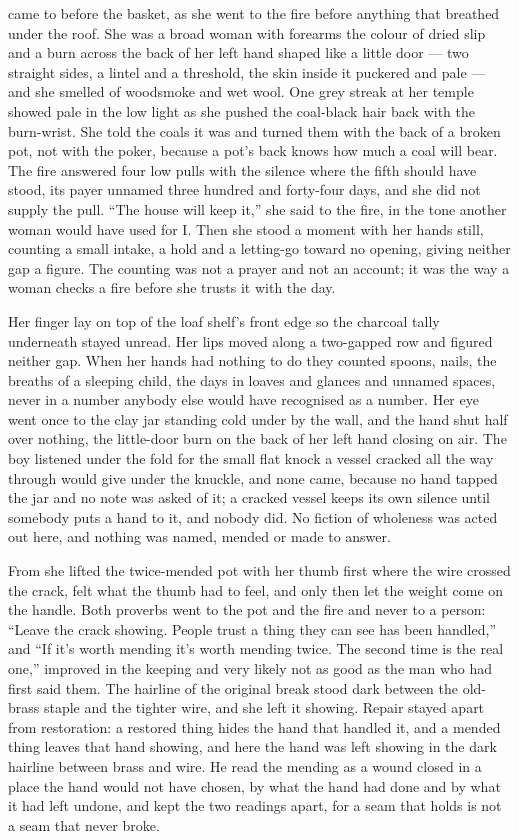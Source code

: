  came to  before the basket, as she went to the fire before anything that breathed under the roof. She was a broad woman with forearms the colour of dried slip and a burn across the back of her left hand shaped like a little door --- two straight sides, a lintel and a threshold, the skin inside it puckered and pale --- and she smelled of woodsmoke and wet wool. One grey streak at her temple showed pale in the low light as she pushed the coal-black hair back with the burn-wrist. She told the coals it was  and turned them with the back of a broken pot, not with the poker, because a pot's back knows how much a coal will bear. The fire answered four low pulls with the silence where the fifth should have stood, its payer unnamed three hundred and forty-four days, and she did not supply the pull. “The house will keep it,” she said to the fire, in the tone another woman would have used for I. Then she stood a moment with her hands still, counting a small intake, a hold and a letting-go toward no opening, giving neither gap a figure. The counting was not a prayer and not an account; it was the way a woman checks a fire before she trusts it with the day.

Her finger lay on top of the loaf shelf's front edge so the charcoal tally underneath stayed unread. Her lips moved along a two-gapped row and figured neither gap. When her hands had nothing to do they counted spoons, nails, the breaths of a sleeping child, the days in loaves and glances and unnamed spaces, never in a number anybody else would have recognised as a number. Her eye went once to the clay jar standing cold under  by the wall, and the hand shut half over nothing, the little-door burn on the back of her left hand closing on air. The boy listened under the fold for the small flat knock a vessel cracked all the way through would give under the knuckle, and none came, because no hand tapped the jar and no note was asked of it; a cracked vessel keeps its own silence until somebody puts a hand to it, and nobody did. No fiction of wholeness was acted out here, and nothing was named, mended or made to answer.

From  she lifted the twice-mended pot with her thumb first where the wire crossed the crack, felt what the thumb had to feel, and only then let the weight come on the handle. Both proverbs went to the pot and the fire and never to a person: “Leave the crack showing. People trust a thing they can see has been handled,” and “If it's worth mending it's worth mending twice. The second time is the real one,” improved in the keeping and very likely not as good as the man who had first said them. The hairline of the original break stood dark between the old-brass staple and the tighter wire, and she left it showing. Repair stayed apart from restoration: a restored thing hides the hand that handled it, and a mended thing leaves that hand showing, and here the hand was left showing in the dark hairline between brass and wire. He read the mending as a wound closed in a place the hand would not have chosen, by what the hand had done and by what it had left undone, and kept the two readings apart, for a seam that holds is not a seam that never broke.

